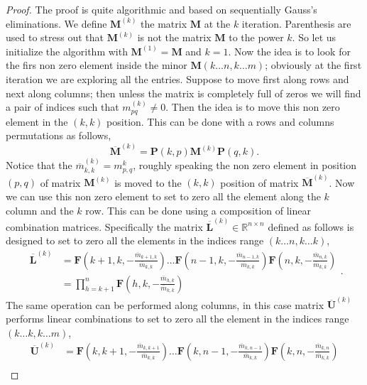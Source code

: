 		\begin{proof}
			The proof is quite algorithmic and based on sequentially Gauss's eliminations. We define $\bm{M}^{(k)}$ the matrix $\bm{M}$ at the $k$ iteration. Parenthesis are used to stress out that $\bm{M}^{(k)}$ is not the matrix $\bm{M}$ to the power $k$. So let us initialize the algorithm with $\bm{M}^{(1)} = \bm{M}$ and $k=1$. Now the idea is to look for the firs non zero element inside the minor $\bm{M}(k\dots n, k\dots m)$; obviously at the first iteration we are exploring all the entries. Suppose to move first along rows and next along columns; then unless the matrix is completely full of zeros we will find a pair of indices such that $m^{(k)}_{pq}\neq 0$. Then the idea is to move this non zero element in the $(k,k)$ position. This can be done with a rows and columns permutations as follows, 
			\begin{equation}
				\overline{\bm{M}}^{(k)} = \bm{P}(k,p)\bm{M}^{(k)}\bm{P}(q,k).
			\end{equation} 
			Notice that the $\overline{m}^{(k)}_{k,k} = m^{k}_{p,q}$, roughly speaking the non zero element in position $(p,q)$ of matrix $\bm{M}^{(k)}$ is moved to the $(k,k)$ position of matrix $\overline{\bm{M}}^{(k)}$. Now we can use this non zero element to set to zero all the element along the $k$ column and the $k$ row. This can be done using a composition of linear combination matrices. Specifically the matrix $\overline{\bm{L}}^{(k)}\in\mathbb{R}^{n\times n}$ defined as follows is designed to set to zero all the elements in the indices range $(k\dots n, k\dots k)$,
			\begin{equation}
				\begin{split}
					\overline{\bm{L}}^{(k)} &= \bm{F}\left(k+1,k,-\frac{\overline{m}_{k+1,k}}{\overline{m}_{k,k}}\right)\dots \bm{F}\left(n-1,k,-\frac{\overline{m}_{n-1,k}}{\overline{m}_{k,k}}\right)\bm{F}\left(n,k,-\frac{\overline{m}_{n,k}}{\overline{m}_{k,k}}\right) \\
					&= \prod_{h=k+1}^{n} \bm{F}\left(h,k,-\frac{\overline{m}_{h,k}}{\overline{m}_{k,k}}\right)
				\end{split}.
			\end{equation}
			The same operation can be performed along columns, in this case matrix $\overline{\bm{U}}^{(k)}$ performs linear combinations to set to zero all the element in the indices range $(k\dots k, k\dots m)$, 
			\begin{equation}
				\begin{split}
					\overline{\bm{U}}^{(k)} &= \bm{F}\left(k,k+1,-\frac{\overline{m}_{k,k+1}}{\overline{m}_{k,k}}\right)\dots \bm{F}\left(k,n-1,-\frac{\overline{m}_{k,n-1}}{\overline{m}_{k,k}}\right)\bm{F}\left(k,n,-\frac{\overline{m}_{k,n}}{\overline{m}_{k,k}}\right) \\

\end{split}
\end{equation}
\end{proof}
